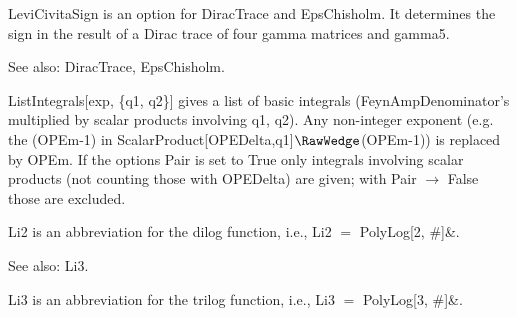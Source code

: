



LeviCivitaSign is an option for DiracTrace and EpsChisholm. It determines the sign in the result of a Dirac trace of four gamma matrices
  and gamma5.

See also:  DiracTrace, EpsChisholm.



ListIntegrals[exp, \{q1, q2\}] gives a list of basic integrals { }(FeynAmpDenominator's multiplied by scalar products involving q1, q2).
  { }Any non-integer exponent (e.g. the (OPEm-1) in { }ScalarProduct[OPEDelta,q1]\(\RawWedge\)(OPEm-1)) is replaced by OPEm. { }If the
  options Pair is set to True only integrals involving { } scalar products (not counting those with OPEDelta) are given; with Pair
  \(\rightarrow \) False those are excluded.





 Li2 is an abbreviation for the dilog function, i.e., Li2 \(=\) PolyLog[2, \#{}]\&{}.

See also: Li3.


\dispSFinmath{
{{\epsilon }^{\alpha \beta \gamma \delta }}
}


\dispSFinmath{
\{ \}
}






 Li3 is an abbreviation for the trilog function, i.e., Li3 \(=\) PolyLog[3, \#{}]\&{}.

